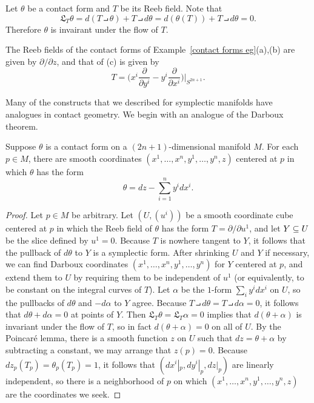 \begin{remark}
Let $\theta$ be a contact form and $T$ be its Reeb field. Note that
\[\mathfrak{L}_{T}\theta=d(T\intprod\theta)+T\intprod d\theta=d(\theta(T))+T\intprod d\theta=0.\]
Therefore $\theta$ is invairant under the flow of $T$.
\end{remark}
\begin{example}
The Reeb fields of the contact forms of Example~\ref{contact forms eg}(a),(b) are given by $\partial/\partial z$, and that of (c) is given by
\[T=\Big(x^i\frac{\partial}{\partial y^i}-y^i\frac{\partial}{\partial x^i}\Big)\Big|_{S^{2n+1}}.\]
\end{example}
Many of the constructs that we described for symplectic manifolds have analogues in contact geometry. We begin with an analogue of the Darboux theorem.
\begin{theorem}
Suppose $\theta$ is a contact form on a $(2n+1)$-dimensional manifold $M$. For each $p\in M$, there are smooth coordinates $(x^1,\dots,x^n,y^1,\dots,y^n,z)$ centered at $p$ in which $\theta$ has the form
\[\theta=dz-\sum_{i=1}^{n}y^idx^i.\]
\end{theorem}
\begin{proof}
Let $p\in M$ be arbitrary. Let $(U,(u^i))$ be a smooth coordinate cube centered at $p$ in which the Reeb field of $\theta$ has the form $T=\partial/\partial u^1$, and let $Y\subseteq U$ be the slice defined by $u^1=0$. Because $T$ is nowhere tangent to $Y$, it follows that the pullback of $d\theta$ to $Y$ is a symplectic form. After shrinking $U$ and $Y$ if necessary, we can find Darboux coordinates $(x^1,\dots,x^n,y^1,\dots,y^n)$ for $Y$ centered at $p$, and extend them to $U$ by requiring them to be independent of $u^1$ (or equivalently, to be constant on the integral curves of $T$). Let $\alpha$ be the $1$-form $\sum_iy^idx^i$ on $U$, so the pullbacks of $d\theta$ and $-d\alpha$ to $Y$ agree. Because $T\intprod d\theta=T\intprod d\alpha=0$, it follows that $d\theta+d\alpha=0$ at points of $Y$. Then $\mathfrak{L}_T\theta=\mathfrak{L}_T\alpha=0$ implies that $d(\theta+\alpha)$ is invariant under the flow of $T$, so in fact $d(\theta+\alpha)=0$ on all of $U$. By the Poincar\'e lemma, there is a smooth function $z$ on $U$ such that $dz=\theta+\alpha$ by subtracting a constant, we may arrange that $z(p)=0$. Because $dz_p(T_p)=\theta_p(T_p)=1$, it follows that $(dx^i|_p,dy^i|_p,dz|_p)$ are linearly independent, so there is a neighborhood of $p$ on which $(x^1,\dots,x^n,y^1,\dots,y^n,z)$ are the coordinates we seek.
\end{proof}
